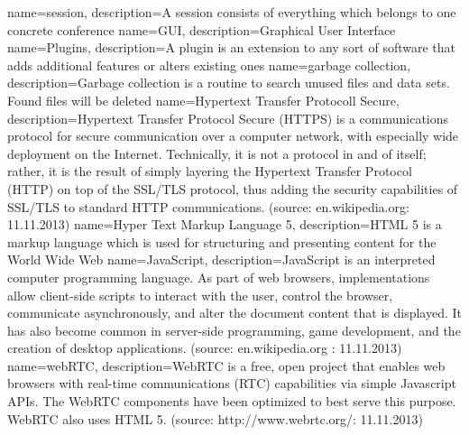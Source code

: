 {
	name=session,
	description={A session consists of everything which belongs to one concrete conference}
}
{	
	name=GUI,
	description={Graphical User Interface}
}
{
	name=Plugins,
	description={A plugin is an extension to any sort of software that adds additional features or alters existing ones}
}
{
name=garbage collection,
description={Garbage collection is a routine to search unused files and data sets. Found files will be deleted}
}
{
name=Hypertext Transfer Protocoll Secure,
description={Hypertext Transfer Protocol Secure (HTTPS) is a communications protocol for secure communication over a computer network, with especially wide deployment on the Internet. Technically, it is not a protocol in and of itself; rather, it is the result of simply layering the Hypertext Transfer Protocol (HTTP) on top of the SSL/TLS protocol, thus adding the security capabilities of SSL/TLS to standard HTTP communications. (source: en.wikipedia.org: 11.11.2013)}
}
{
name=Hyper Text Markup Language 5,
description={HTML 5 is a markup language which is used for structuring and presenting content for the World Wide Web}
}
{
name=JavaScript,
description={JavaScript is an interpreted computer programming language. As part of web browsers, implementations allow client-side scripts to interact with the user, control the browser, communicate asynchronously, and alter the document content that is displayed. It has also become common in server-side programming, game development, and the creation of desktop applications. (source: en.wikipedia.org : 11.11.2013)}
}
{
name=webRTC,
description={WebRTC is a free, open project that enables web browsers with real-time communications (RTC) capabilities via simple Javascript APIs. The WebRTC components have been optimized to best serve this purpose. WebRTC also uses HTML 5. (source: http://www.webrtc.org/: 11.11.2013)}
}



